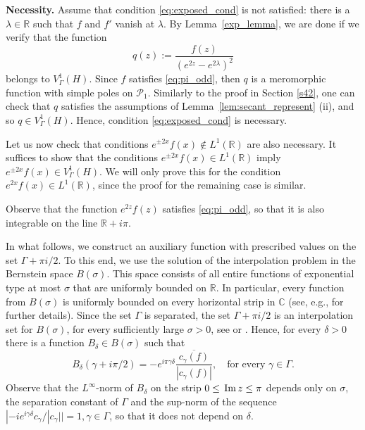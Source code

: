 \documentclass[12pt]{amsart}
\numberwithin{equation}{section}
\theoremstyle{plain}
\theoremstyle{definition}
\newcommand{\R}{{\mathbb R}} \newcommand{\Q}{{\mathbb Q}} \newcommand{\Z}{{\mathbb Z}} \newcommand{\N}{{\mathbb N}}
\newcommand{\Cc}{{\mathbb C}}
\begin{document}
{\bf Necessity.}
    Assume that condition \eqref{eq:exposed_cond} is not satisfied: 
    there is a $\lambda \in \R$ such that $f$ and $f'$ vanish at $\lambda$.     
    By Lemma~\ref{exp_lemma}, we are done if we verify that the function 
$$q(z):=\frac{f(z)}{(e^{2z}-e^{2\lambda})^2}$$
belongs to $V^1_{\Gamma}(H)$.  Since $f$ satisfies \eqref{eq:pi_odd}, then $q$ is a meromorphic function with simple poles on $\mathcal{P}_1$. 
Similarly to the proof in Section \ref{s42}, one can check that $q$ satisfies the assumptions of Lemma~\ref{lem:secant_represent} (ii), and so $q\in V^1_{\Gamma}(H).$ Hence, condition \eqref{eq:exposed_cond} is necessary.


Let us now check that conditions $e^{\pm 2x}f(x)\not\in L^1(\R)$ are also necessary. 
It suffices to show that the conditions $e^{\pm 2x}f(x)\in L^1(\R)$ imply $e^{\pm 2x}f(x)\in V^1_\Gamma(H)$. We will only prove this for the condition  $e^{2x}f(x)\in L^1(\R)$, since the proof for the remaining case is similar. 


Observe that the function $e^{2z}f(z)$ satisfies \eqref{eq:pi_odd}, so that it is also integrable on the line $\R+i\pi$. 

In what follows, we construct an auxiliary function with prescribed values on the set $\Gamma + \pi i/2$. 
To this end, we use the solution of the interpolation problem in the Bernstein space $B(\sigma)$. 
This space consists of all entire functions of exponential type at most $\sigma$ that are uniformly bounded on $\mathbb{R}$. In particular, every function from $B(\sigma)$ is uniformly bounded on every horizontal strip in $\Cc$ (see, e.g., \cite{MR3468930} for further details).
Since the set $\Gamma$ is separated, the set $\Gamma+\pi i/2$ is an interpolation set for $B(\sigma)$, for every sufficiently large $\sigma>0$, see \cite{MR1057613} or \cite{MR3468930}. Hence, for every $\delta>0$ there is a function $B_\delta\in B(\sigma)$  such that
$$B_\delta(\gamma+i\pi/2)=-e^{i\pi\gamma\delta}\frac{\overline{c_\gamma(f)}}{|c_\gamma(f)|},\quad \text{for every } \gamma\in\Gamma.$$
Observe that the $L^\infty$-norm of $B_\delta$ on the strip $0\leq\, {\rm Im\,}z\leq\pi$ depends only on $\sigma$, the separation constant of $\Gamma$ and the sup-norm of the sequence $|-ie^{i\gamma\delta}c_\gamma/|c_\gamma||=1,\gamma\in\Gamma$, so that it does not depend on $\delta.$
\end{document}

